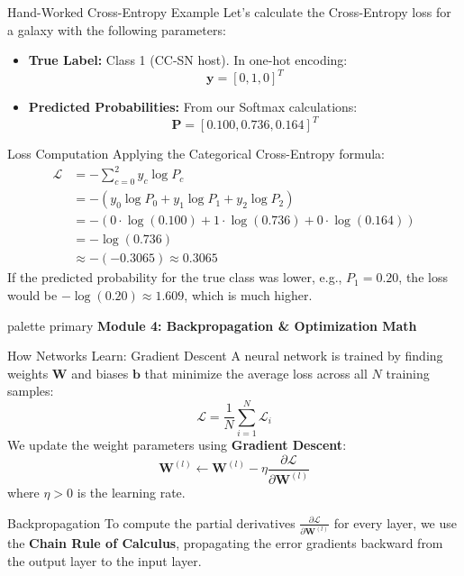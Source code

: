 \documentclass[9pt]{beamer}
\begin{document}
\begin{frame}{Hand-Worked Cross-Entropy Example}
  Let's calculate the Cross-Entropy loss for a galaxy with the following parameters:
  \begin{itemize}
    \item \textbf{True Label:} Class 1 (CC-SN host). In one-hot encoding:
      $$\mathbf{y} = [0, 1, 0]^T$$
    \item \textbf{Predicted Probabilities:} From our Softmax calculations:
      $$\mathbf{P} = [0.100, 0.736, 0.164]^T$$
  \end{itemize}
  \begin{block}{Loss Computation}
    Applying the Categorical Cross-Entropy formula:
    \begin{align*}
      \mathcal{L} &= - \sum_{c=0}^{2} y_c \log P_c \\
      &= - \left( y_0 \log P_0 + y_1 \log P_1 + y_2 \log P_2 \right) \\
      &= - \left( 0 \cdot \log(0.100) + 1 \cdot \log(0.736) + 0 \cdot \log(0.164) \right) \\
      &= - \log(0.736) \\
      &\approx - (-0.3065) \approx \mathbf{0.3065}
    \end{align*}
    If the predicted probability for the true class was lower, e.g., $P_1 = 0.20$, the loss would be $- \log(0.20) \approx 1.609$, which is much higher.
  \end{block}
\end{frame}

\begin{frame}[plain]
  \vfill
  \centering
  \begin{beamercolorbox}[sep=8pt,center,shadow=true,rounded=true]{palette primary}
    \textbf{Module 4: Backpropagation \& Optimization Math}
  \end{beamercolorbox}
  \vfill
\end{frame}

\begin{frame}{How Networks Learn: Gradient Descent}
  A neural network is trained by finding weights $\mathbf{W}$ and biases $\mathbf{b}$ that minimize the average loss across all $N$ training samples:
  $$\mathcal{L} = \frac{1}{N} \sum_{i=1}^N \mathcal{L}_i$$
  We update the weight parameters using \textbf{Gradient Descent}:
  $$\mathbf{W}^{(l)} \leftarrow \mathbf{W}^{(l)} - \eta \frac{\partial \mathcal{L}}{\partial \mathbf{W}^{(l)}}$$
  where $\eta > 0$ is the learning rate.
  \begin{block}{Backpropagation}
    To compute the partial derivatives $\frac{\partial \mathcal{L}}{\partial \mathbf{W}^{(l)}}$ for every layer, we use the \textbf{Chain Rule of Calculus}, propagating the error gradients backward from the output layer to the input layer.
  \end{block}
\end{frame}
\end{document}
